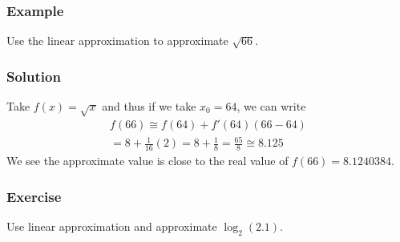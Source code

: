 \documentclass[letterpaper,10pt,twoside,twocolumn,openany]{book}
\begin{document}
\subsubsection*{Example}
Use the linear approximation to approximate $\sqrt{66}$.
\subsubsection*{Solution}
Take $f ( x) = \sqrt{x}$ and thus if we take $x_0 = 64$, we can write
\begin{gather*}
    f ( 66) \cong f ( 64) + f' ( 64) ( 66 - 64)\\
    = 8 + \frac{1}{16} ( 2) = 8 + \frac{1}{8} = \frac{65}{8} \cong 8.125 
\end{gather*} 
We see the approximate value is close to the real value of $f ( 66) = 8.1240384$.

\subsubsection*{Exercise}
Use linear approximation and approximate $\log_2 ( 2.1)$.

\newpage
\end{document}
